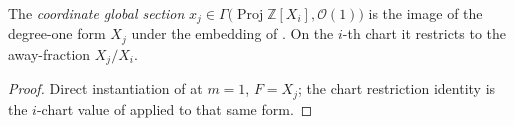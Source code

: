 \begin{definition}
  \label{def:coordinate_section}
  The \emph{coordinate global section} \(x_j \in \Gamma\bigl(
  \operatorname{Proj} \mathbb Z[X_i], \mathcal O(1)\bigr)\) is the image of
  the degree-one form \(X_j\) under the embedding of
  . On the \(i\)-th chart it restricts to
  the away-fraction \(X_j/X_i\).
\end{definition}
\begin{proof}\leanok
  Direct instantiation of  at
  \(m = 1\), \(F = X_j\); the chart restriction identity is the \(i\)-chart
  value of  applied to that same form.
\end{proof}

